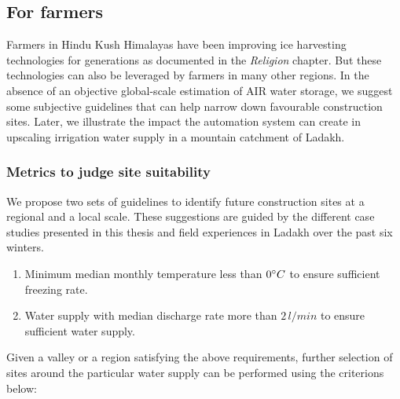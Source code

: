 

\subsection{For farmers}

Farmers in Hindu Kush Himalayas have been improving ice harvesting technologies for generations as documented in
the \textit{Religion} chapter. But these technologies can also be leveraged by farmers in many other regions. In
the absence of an objective global-scale estimation of AIR water storage, we suggest some subjective guidelines
that can help narrow down favourable construction sites. Later, we illustrate the impact the automation system
can create in upscaling irrigation water supply in a mountain catchment of Ladakh.

\subsubsection{Metrics to judge site suitability}

We propose two sets of guidelines to identify future construction sites at a regional and a local scale. These
suggestions are guided by the different case studies presented in this thesis and field experiences in
Ladakh over the past six winters.


\begin{enumerate}

	\item Minimum median monthly temperature less than $0 ^{\circ} C$ to ensure sufficient freezing rate.
	\item Water supply with median discharge rate more than $2\, l/min$ to ensure sufficient water supply.

\end{enumerate}


Given a valley or a region satisfying the above requirements, further selection of sites around the particular
water supply can be performed using the criterions below:

